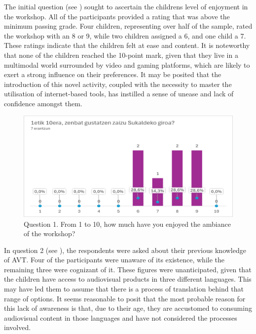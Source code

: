 The initial question (see ) sought to ascertain the
children\textquotesingle s level of enjoyment in the workshop. All of
the participants provided a rating that was above the minimum passing
grade. Four children, representing over half of the sample, rated the
workshop with an 8 or 9, while two children assigned a 6, and one child
a 7. These ratings indicate that the children felt at ease and content.
It is noteworthy that none of the children reached the 10-point mark,
given that they live in a multimodal world surrounded by video and
gaming platforms, which are likely to exert a strong influence on their
preferences. It may be posited that the introduction of this novel
activity, coupled with the necessity to master the utilisation of
internet-based tools, has instilled a sense of unease and lack of
confidence amongst them.
\begin{figure}[htbp]
    \centering
    \begin{minipage}{.5\textwidth}
    \includegraphics[width=\textwidth]{fig01.png}
    \caption{Question 1. From 1 to 10, how much have you enjoyed
    the ambiance of the workshop?}
    \label{fig-01}
    \end{minipage}
\end{figure}

In question 2 (see ), the respondents were asked about their
previous knowledge of AVT. Four of the participants were unaware of its
existence, while the remaining three were cognizant of it. These figures
were unanticipated, given that the children have access to audiovisual
products in three different languages. This may have led them to assume
that there is a process of translation behind that range of options. It
seems reasonable to posit that the most probable reason for this lack of
awareness is that, due to their age, they are accustomed to consuming
audiovisual content in those languages and have not considered the
processes involved.

